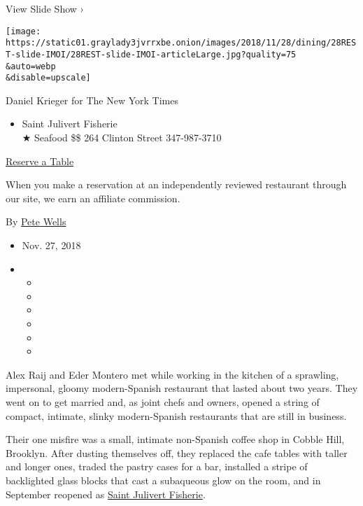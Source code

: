 View Slide Show ›

\texttt{[image: https://static01.graylady3jvrrxbe.onion/images/2018/11/28/dining/28REST-slide-IMOI/28REST-slide-IMOI-articleLarge.jpg?quality=75\\\&auto=webp\\\&disable=upscale]}

Daniel Krieger for The New York Times

\begin{itemize}
\tightlist
\item
  Saint Julivert Fisherie\\
  ★ Seafood \$\$ 264 Clinton Street 347-987-3710
\end{itemize}

\href{https://www.opentable.com/r/saint-julivert-reservations-brooklyn?ref=4201\&rid=1028269}{Reserve
a Table}

When you make a reservation at an independently reviewed restaurant
through our site, we earn an affiliate commission.

By \href{https://www.nytimes3xbfgragh.onion/by/pete-wells}{Pete Wells}

\begin{itemize}
\item
  Nov. 27, 2018
\item
  \begin{itemize}
  \item
  \item
  \item
  \item
  \item
  \item
  \end{itemize}
\end{itemize}

Alex Raij and Eder Montero met while working in the kitchen of a
sprawling, impersonal, gloomy modern-Spanish restaurant that lasted
about two years. They went on to get married and, as joint chefs and
owners, opened a string of compact, intimate, slinky modern-Spanish
restaurants that are still in business.

Their one misfire was a small, intimate non-Spanish coffee shop in
Cobble Hill, Brooklyn. After dusting themselves off, they replaced the
cafe tables with taller and longer ones, traded the pastry cases for a
bar, installed a stripe of backlighted glass blocks that cast a
subaqueous glow on the room, and in September reopened as
\href{https://www.saintjulivertbk.com/}{Saint Julivert Fisherie}.

